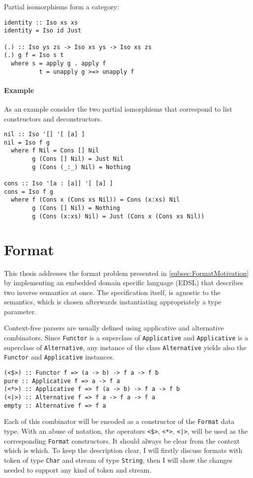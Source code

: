 \documentclass[../Thesis.tex]{subfiles}
\begin{document}
Partial isomorphisms form a category:
\begin{verbatim}
identity :: Iso xs xs
identity = Iso id Just

(.) :: Iso ys zs -> Iso xs ys -> Iso xs zs
(.) g f = Iso s t
  where s = apply g . apply f
          t = unapply g >=> unapply f
\end{verbatim}

\paragraph{Example} 
As an example consider the two partial iomorphisms that correspond
to list constructors and deconstructors. 

\begin{verbatim}
nil :: Iso '[] '[ [a] ]
nil = Iso f g
  where f Nil = Cons [] Nil
        g (Cons [] Nil) = Just Nil
        g (Cons (_:_) Nil) = Nothing

cons :: Iso '[a : [a]] '[ [a] ]
cons = Iso f g
  where f (Cons x (Cons xs Nil)) = Cons (x:xs) Nil
        g (Cons [] Nil) = Nothing
        g (Cons (x:xs) Nil) = Just (Cons x (Cons xs Nil))
\end{verbatim}

\section{Format}
\label{sec:Format}
This thesis addresses the format problem presented in 
\ref{subsec:FormatMotivation} by implementing an embedded domain specific language (EDSL) that describes two inverse semantics at once.
The specification itself, is agnostic to the semantics, which is chosen afterwards instantiating appropriately a type parameter.

Context-free parsers are usually defined using applicative 
and alternative combinators. Since \texttt{Functor} is a superclass of \texttt{Applicative} and \texttt{Applicative} is a superclass of \texttt{Alternative}, any instance of the class \texttt{Alternative} yields
also the \texttt{Functor} and \texttt{Applicative} instances.

\begin{verbatim}
(<$>) :: Functor f => (a -> b) -> f a -> f b
pure :: Applicative f => a -> f a
(<*>) :: Applicative f => f (a -> b) -> f a -> f b
(<|>) :: Alternative f => f a -> f a -> f a
empty :: Alternative f => f a
\end{verbatim} 

Each of this combinator will be encoded as a constructor of the \texttt{Format} data type. With an abuse of notation, the operators \texttt{<\$>}, \texttt{<*>}, \texttt{<|>}, will be used as the corresponding \texttt{Format} constructors. 
It should always be clear from the context which is which. 
To keep the description clear, I will firstly discuss formats with token of type \texttt{Char} and stream of type \texttt{String}, then I will show the changes needed to support any kind of token and stream.
\end{document}
